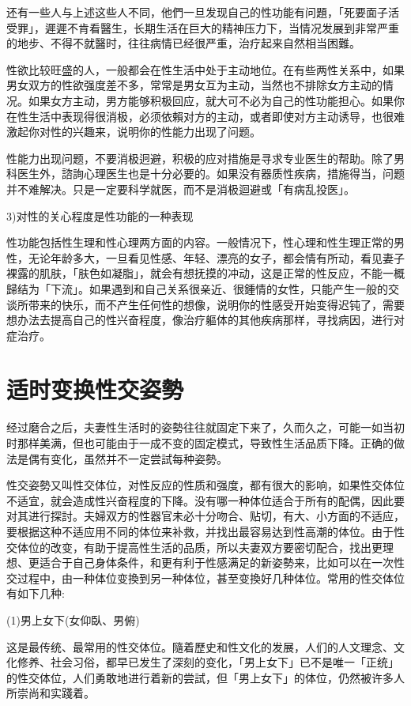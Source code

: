 \documentclass[12pt,UTF8]{ctexbook}
\begin{document}
还有一些人与上述这些人不同，他們一旦发现自己的性功能有问題，「死要面子活受罪」，遲遲不肯看醫生，长期生活在巨大的精神压力下，当情况发展到非常严重的地步、不得不就醫时，往往病情已经很严重，治疗起来自然相当困難。

性欲比较旺盛的人，一般都会在性生活中处于主动地位。在有些两性关系中，如果男女双方的性欲强度差不多，常常是男女互为主动，当然也不排除女方主动的情况。如果女方主动，男方能够积极回应，就大可不必为自己的性功能担心。如果你在性生活中表现得很消极，必须依賴对方的主动，或者即使对方主动诱导，也很难激起你对性的兴趣来，说明你的性能力出现了问题。

性能力出现问题，不要消极迥避，积极的应对措施是寻求专业医生的帮助。除了男科医生外，諮詢心理医生也是十分必要的。如果没有器质性疾病，措施得当，问题并不难解决。只是一定要科学就医，而不是消极迴避或「有病乱投医」。

3)对性的关心程度是性功能的一种表现

性功能包括性生理和性心理两方面的内容。一般情况下，性心理和性生理正常的男性，无论年龄多大，一旦看见性感、年轻、漂亮的女子，都会情有所动，看见妻子裸露的肌肤，「肤色如凝脂」，就会有想抚摸的冲动，这是正常的性反应，不能一概歸结为「下流」。如果遇到和自己关系很亲近、很鍾情的女性，只能产生一般的交谈所带来的快乐，而不产生任何性的想像，说明你的性感受开始变得迟钝了，需要想办法去提高自己的性兴奋程度，像治疗軀体的其他疾病那样，寻找病因，进行对症治疗。

\section{适时变换性交姿勢}

经过磨合之后，夫妻性生活时的姿勢往往就固定下来了，久而久之，可能一如当初时那样美满，但也可能由于一成不变的固定模式，导致性生活品质下降。正确的做法是偶有变化，虽然并不一定尝試每种姿勢。

性交姿勢又叫性交体位，对性反应的性质和强度，都有很大的影响，如果性交体位不适宜，就会造成性兴奋程度的下降。没有哪一种体位适合于所有的配偶，因此要对其进行探討。夫婦双方的性器官未必十分吻合、贴切，有大、小方面的不适应，要根据这种不适应用不同的体位来补救，并找出最容易达到性高潮的体位。由于性交体位的改变，有助于提高性生活的品质，所以夫妻双方要密切配合，找出更理想、更适合于自己身体条件，和更有利于性感满足的新姿勢来，比如可以在一次性交过程中，由一种体位变換到另一种体位，甚至变換好几种体位。常用的性交体位有如下几种:

(1)男上女下(女仰臥、男俯)

这是最传统、最常用的性交体位。隨着歷史和性文化的发展，人们的人文理念、文化修养、社会习俗，都早已发生了深刻的变化，「男上女下」已不是唯一「正统」的性交体位，人们勇敢地进行着新的尝試，但「男上女下」的体位，仍然被许多人所崇尚和实踐着。
\end{document}
